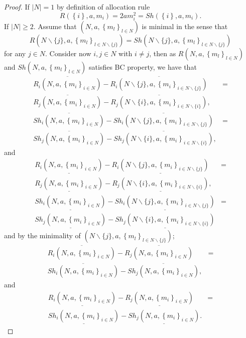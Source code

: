 \documentclass[12pt]{article}
\begin{document}
\begin{proof}
\noindent  If $\left\vert N\right\vert =1$ by definition of allocation rule
\begin{equation*}
R\left( \left\{ i\right\},a, m_{i}\right) =2am_{i}^{2}=Sh\left( \left\{ i\right\},a, m_{i}\right).
\end{equation*}%
If $\left\vert N\right\vert \geq 2.$ Assume that $\left( N,a,\left\{ m_{l}\right\} _{l\in N}\right)$ is minimal in the sense
that 
$$R\left( N\backslash\{j\},a,\left\{ m_{l}\right\} _{l\in N\backslash\{j\}}\right) =Sh\left( N\backslash\{j\},a,\left\{ m_{l}\right\} _{l\in N\backslash\{j\}}\right) $$
for any $j\in N$. Consider now $i,j\in N$ with $i\neq j$, then as $R\left( N,a,\left\{ m_{l}\right\} _{l\in N}\right) $ and $Sh\left( N,a,\left\{ m_{l}\right\} _{l\in N}\right) $ satisfies BC property, we have that
\begin{eqnarray*}
\overline{R_{i}(N,a,\left\{ m_{i}\right\} _{i\in
N})} -\overline{R_{i}(N\backslash\{j\},a,\left\{ m_{i}\right\} _{i\in
N\backslash\{j\}})}& = \\
\overline{R_{j}(N,a,\left\{ m_{i}\right\} _{i\in
N})}
-\overline{R_{j}(N\backslash\{i\},a,\left\{ m_{i}\right\} _{i\in
N\backslash\{i\}})},&\\
\overline{Sh_{i}(N,a,\left\{ m_{i}\right\} _{i\in
N})} -\overline{Sh_{i}(N\backslash\{j\},a,\left\{ m_{i}\right\} _{i\in
N\backslash\{j\}})} &=\\
\overline{Sh_{j}(N,a,\left\{ m_{i}\right\} _{i\in
N})}
-\overline{Sh_{j}(N\backslash\{i\},a,\left\{ m_{i}\right\} _{i\in
N\backslash\{i\}})},
\end{eqnarray*}%
and
\begin{eqnarray*}
\underline{R_{i}(N,a,\left\{ m_{i}\right\} _{i\in
N})} -\underline{R_{i}(N\backslash\{j\},a,\left\{ m_{i}\right\} _{i\in
N\backslash\{j\}})} &=\\
\underline{R_{j}(N,a,\left\{ m_{i}\right\} _{i\in
N})}
-\underline{R_{j}(N\backslash\{i\},a,\left\{ m_{i}\right\} _{i\in
N\backslash\{i\}})},&\\
\underline{Sh_{i}(N,a,\left\{ m_{i}\right\} _{i\in
N})} -\underline{Sh_{i}(N\backslash\{j\},a,\left\{ m_{i}\right\} _{i\in
N\backslash\{j\}})} &=\\
\underline{Sh_{j}(N,a,\left\{ m_{i}\right\} _{i\in
N})}
-\underline{Sh_{j}(N\backslash\{i\},a,\left\{ m_{i}\right\} _{i\in
N\backslash\{i\}})}
\end{eqnarray*}%
and by the minimality of $\left( N\backslash\{j\},a,\left\{ m_{l}\right\} _{l\in N\backslash\{j\}}\right)$;
\begin{eqnarray*}
\overline{R_{i}(N,a,\left\{ m_{i}\right\} _{i\in
N})} -
\overline{R_{j}(N,a,\left\{ m_{i}\right\} _{i\in
N})} &=\\
\overline{Sh_{i}(N,a,\left\{ m_{i}\right\} _{i\in
N})} -
\overline{Sh_{j}(N,a,\left\{ m_{i}\right\} _{i\in
N})},
\end{eqnarray*}%
and
\begin{eqnarray*}
\underline{R_{i}(N,a,\left\{ m_{i}\right\} _{i\in
N})} -
\underline{R_{j}(N,a,\left\{ m_{i}\right\} _{i\in
N})} &=\\
\underline{Sh_{i}(N,a,\left\{ m_{i}\right\} _{i\in
N})} -
\underline{Sh_{j}(N,a,\left\{ m_{i}\right\} _{i\in
N})}.&
\end{eqnarray*}%


\end{proof}
\end{document}
